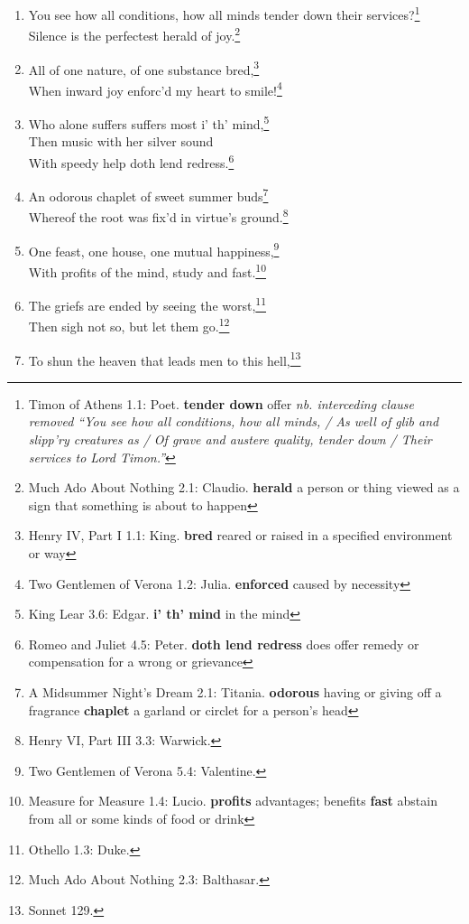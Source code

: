 \documentclass[17pt,twoside]{extarticle}
\begin{document}
\begin{enumerate}
{    argument or disagreement}
\item
  You see how all conditions, how all minds tender down their
  services?\footnote{Timon of Athens 1.1: Poet. \textbf{tender down}
    offer \emph{nb. interceding clause removed ``You see how all
    conditions, how all minds, / As well of glib and slipp'ry creatures
    as / Of grave and austere quality, tender down / Their services to
    Lord Timon.''}}\\Silence is the perfectest herald of joy.\footnote{Much
    Ado About Nothing 2.1: Claudio. \textbf{herald} a person or thing
    viewed as a sign that something is about to happen}
\item
  All of one nature, of one substance bred,\footnote{Henry IV, Part I
    1.1: King. \textbf{bred} reared or raised in a specified environment
    or way}\\When inward joy enforc'd my heart to smile!\footnote{Two
    Gentlemen of Verona 1.2: Julia. \textbf{enforced} caused by
    necessity}
\item
  Who alone suffers suffers most i' th' mind,\footnote{King Lear 3.6:
    Edgar. \textbf{i' th' mind} in the mind}\\Then music with her silver
  sound\\With speedy help doth lend redress.\footnote{Romeo and Juliet
    4.5: Peter. \textbf{doth lend redress} does offer remedy or
    compensation for a wrong or grievance}
\item
  An odorous chaplet of sweet summer buds\footnote{A Midsummer Night's
    Dream 2.1: Titania. \textbf{odorous} having or giving off a
    fragrance \textbf{chaplet} a garland or circlet for a person's head}\\Whereof
  the root was fix'd in virtue's ground.\footnote{Henry VI, Part III
    3.3: Warwick.}
\item
  One feast, one house, one mutual happiness,\footnote{Two Gentlemen of
    Verona 5.4: Valentine.}\\With profits of the mind, study and
  fast.\footnote{Measure for Measure 1.4: Lucio. \textbf{profits}
    advantages; benefits \textbf{fast} abstain from all or some kinds of
    food or drink}
\item
  The griefs are ended by seeing the worst,\footnote{Othello 1.3: Duke.}\\Then
  sigh not so, but let them go.\footnote{Much Ado About Nothing 2.3:
    Balthasar.}
\item
  To shun the heaven that leads men to this hell,\footnote{Sonnet 129.
}
\end{enumerate}
\end{document}
